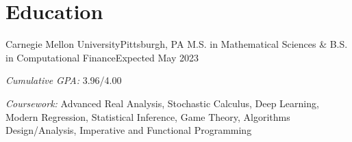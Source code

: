 \section{Education}
\resumeSectionStart

    \resumeSubheading
        {Carnegie Mellon University}{Pittsburgh, PA}
        {M.S. in Mathematical Sciences \& B.S. in Computational Finance}{Expected May 2023}
    
    \resumeItemListStart
        \item \textit{Cumulative GPA:} 3.96/4.00
        \item \textit{Coursework:} Advanced Real Analysis, Stochastic Calculus, Deep Learning, Modern Regression, Statistical Inference, Game Theory, Algorithms Design/Analysis, Imperative and Functional Programming
    \resumeItemListEnd

\resumeSectionEnd
